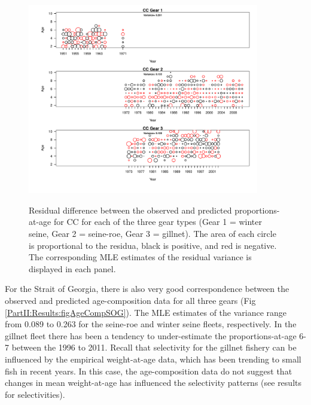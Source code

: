 \begin{figure}
	\centering
	\includegraphics[width=0.9\textwidth]{../FIGS/qPriorFigs/iscam_fig_agecompsresid_CC.pdf}\\
	\caption{Residual difference between the observed and predicted proportions-at-age for CC for each of the three gear types (Gear 1 = winter seine, Gear 2 = seine-roe, Gear 3 = gillnet).  The area of each circle is proportional to the residua, black is positive, and red is negative.  The corresponding MLE estimates of the residual variance is displayed in each panel.}\label{PartII:Results:figAgeCompCC}
\end{figure}

For the Strait of Georgia, there is also very good correspondence between the observed and predicted age-composition data for all three gears (Fig \ref{PartII:Results:figAgeCompSOG}).  The MLE estimates of the variance range from 0.089 to 0.263 for the seine-roe and winter seine fleets, respectively.  In the gillnet fleet  there has been a tendency to under-estimate the proportions-at-age 6-7 between the 1996 to 2011. Recall that selectivity for the gillnet fishery can be influenced by the empirical weight-at-age data, which has been trending to small fish in recent years.  In this case, the age-composition data do not suggest that changes in mean weight-at-age has influenced the selectivity patterns (see results for selectivities).


